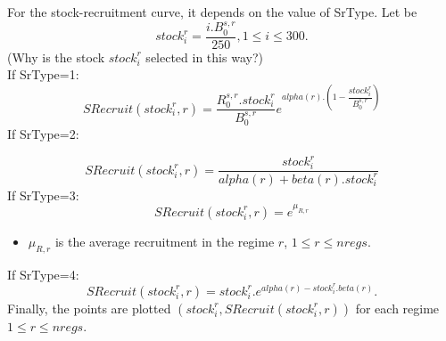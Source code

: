 \documentclass{article}
\begin{document}
For the stock-recruitment curve, it depends on the value of SrType. Let be
\begin{equation}
    stock^r_i=\dfrac{i.B^{s,r}_0}{250}, 1\leq i \leq 300.
\end{equation}
(Why is the stock $stock^r_i$ selected in this way?)\\
If SrType=1:
\begin{equation}
SRecruit(stock^r_i,r)=\dfrac{R^{s,r}_0.stock^r_i}{B^{s,r}_0}e^{alpha(r).\left(1-\dfrac{stock^r_i}{B^{s,r}_0}\right)}
\end{equation}
If SrType=2:

\begin{equation}
SRecruit(stock^r_i,r)=\dfrac{stock^r_i}{alpha(r)+beta(r).stock^r_i}
        \end{equation}
If SrType=3:
\begin{equation}
SRecruit(stock^r_i,r)=e^{\mu_{R,r}}
\end{equation}
\begin{itemize}
    \item $\mu_{R,r}$ is the average recruitment in the regime $r$, $1\leq r \leq nregs$.
\end{itemize}
If SrType=4:
\begin{equation}
SRecruit(stock^r_i,r) =  stock^r_i.e^{alpha(r)-stock^r_i.beta(r)}.
\end{equation}
Finally, the points are plotted $(stock^r_i, SRecruit(stock^r_i,r))$ for each regime $1\leq r \leq nregs$.








\end{document}
